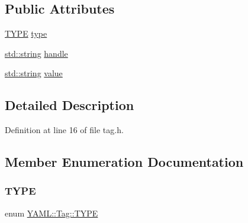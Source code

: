 \subsection*{Public Attributes}
\begin{DoxyCompactItemize}
\item 
\mbox{\hyperlink{struct_y_a_m_l_1_1_tag_a907531a31b340a01caa4b445ef988918}{T\+Y\+PE}} \mbox{\hyperlink{struct_y_a_m_l_1_1_tag_a054044b707b23a33c847a5a346c16209}{type}}
\item 
\mbox{\hyperlink{glad_8h_ac83513893df92266f79a515488701770}{std\+::string}} \mbox{\hyperlink{struct_y_a_m_l_1_1_tag_a119563f2d43ab1d62ba3e4648a12374b}{handle}}
\item 
\mbox{\hyperlink{glad_8h_ac83513893df92266f79a515488701770}{std\+::string}} \mbox{\hyperlink{struct_y_a_m_l_1_1_tag_a628cc6d02e69a7cd6b48e8ae17960385}{value}}
\end{DoxyCompactItemize}


\subsection{Detailed Description}


Definition at line 16 of file tag.\+h.



\subsection{Member Enumeration Documentation}
\mbox{\label{struct_y_a_m_l_1_1_tag_a907531a31b340a01caa4b445ef988918}} 
\subsubsection{\texorpdfstring{TYPE}{TYPE}}
{\footnotesize\ttfamily enum \mbox{\hyperlink{struct_y_a_m_l_1_1_tag_a907531a31b340a01caa4b445ef988918}{Y\+A\+M\+L\+::\+Tag\+::\+T\+Y\+PE}}}


